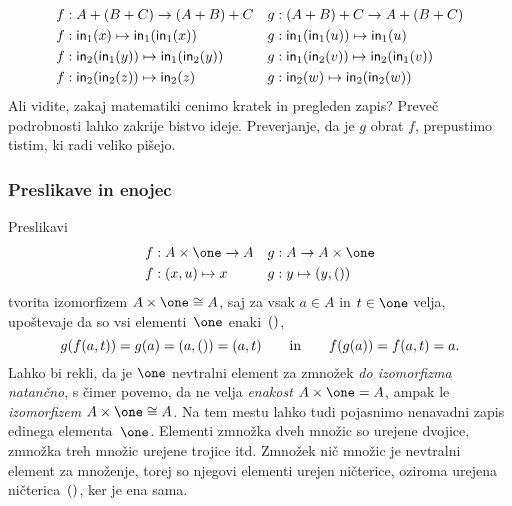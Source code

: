 %
\begin{align*}
  f &:  A + (B + C) \to (A + B) + C &
  g &: (A + B) + C \to A + (B + C) \\
  f &: \mathsf{in}_{1}(x)             \mapsto \mathsf{in}_{1}(\mathsf{in}_{1}(x)) &
  g &: \mathsf{in}_{1}(\mathsf{in}_{1}(u)) \mapsto \mathsf{in}_{1}(u)\\
  f &: \mathsf{in}_{2}(\mathsf{in}_{1}(y)) \mapsto \mathsf{in}_{1}(\mathsf{in}_{2}(y)) &
  g &: \mathsf{in}_{1}(\mathsf{in}_{2}(v)) \mapsto \mathsf{in}_{2}(\mathsf{in}_{1}(v))  \\
  f &: \mathsf{in}_{2}(\mathsf{in}_{2}(z)) \mapsto \mathsf{in}_{2}(z) &
  g &: \mathsf{in}_{2}(w)              \mapsto \mathsf{in}_{2}(\mathsf{in}_{2}(w))
\end{align*}
%
Ali vidite, zakaj matematiki cenimo kratek in pregleden zapis? Preveč podrobnosti lahko
zakrije bistvo ideje. Preverjanje, da je $g$ obrat $f$, prepustimo tistim, ki radi veliko
pišejo.

\subsubsection{Preslikave in enojec}
\label{sec:preslikave-enojec}

Preslikavi
%
\begin{align*}
  f &: A \times \one \to A &
  g &: A \to A \times \one \\
  f &: (x, u) \mapsto x &
  g &: y \mapsto (y, \unit)
\end{align*}
%
tvorita izomorfizem $A \times \one \cong A$, saj za vsak $a \in A$ in $t \in \one$ velja,
upoštevaje da so vsi elementi~$\one$ enaki~$()$,
%
\begin{equation*}
  g(f(a, t)) = g(a) = (a, ()) = (a, t)
  \qquad\text{in}\qquad
  f(g(a)) = f(a, t) = a.
\end{equation*}
%
Lahko bi rekli, da je $\one$ nevtralni element za zmnožek \emph{do izomorfizma natančno},
s čimer povemo, da ne velja \emph{enakost} $A \times \one = A$, ampak le
\emph{izomorfizem} $A \times \one \cong A$. Na tem mestu lahko tudi pojasnimo nenavadni
zapis edinega elementa~$\one$. Elementi zmnožka dveh množic so urejene dvojice, zmnožka
treh množic urejene trojice itd. Zmnožek nič množic je nevtralni element za množenje,
torej so njegovi elementi urejen ničterice, oziroma urejena ničterica~$()$, ker je ena
sama.

